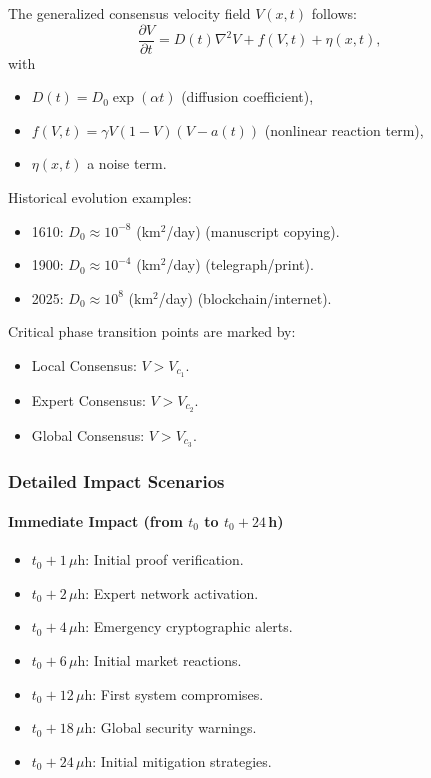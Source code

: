 \documentclass[11pt]{article}
\begin{document}
The generalized consensus velocity field $V(x,t)$ follows:
\[
\frac{\partial V}{\partial t} = D(t)\nabla^2 V + f(V,t) + \eta(x,t),
\]
with
\begin{itemize}
    \item $D(t)=D_0\exp(\alpha t)$ (diffusion coefficient),
    \item $f(V,t)=\gamma V (1-V)(V-a(t))$ (nonlinear reaction term),
    \item $\eta(x,t)$ a noise term.
\end{itemize}

Historical evolution examples:
\begin{itemize}
    \item 1610: $D_0\approx10^{-8}$ (km$^2$/day) (manuscript copying).
    \item 1900: $D_0\approx10^{-4}$ (km$^2$/day) (telegraph/print).
    \item 2025: $D_0\approx10^{8}$ (km$^2$/day) (blockchain/internet).
\end{itemize}

Critical phase transition points are marked by:
\begin{itemize}
    \item Local Consensus: $V > V_{c_1}$.
    \item Expert Consensus: $V > V_{c_2}$.
    \item Global Consensus: $V > V_{c_3}$.
\end{itemize}

\subsubsection{Detailed Impact Scenarios}

\paragraph{Immediate Impact (from $t_0$ to $t_0+24\,$h)}
\begin{itemize}
    \item $t_0+1\,\mu\text{h}$: Initial proof verification.
    \item $t_0+2\,\mu\text{h}$: Expert network activation.
    \item $t_0+4\,\mu\text{h}$: Emergency cryptographic alerts.
    \item $t_0+6\,\mu\text{h}$: Initial market reactions.
    \item $t_0+12\,\mu\text{h}$: First system compromises.
    \item $t_0+18\,\mu\text{h}$: Global security warnings.
    \item $t_0+24\,\mu\text{h}$: Initial mitigation strategies.
\end{itemize}
\end{document}
